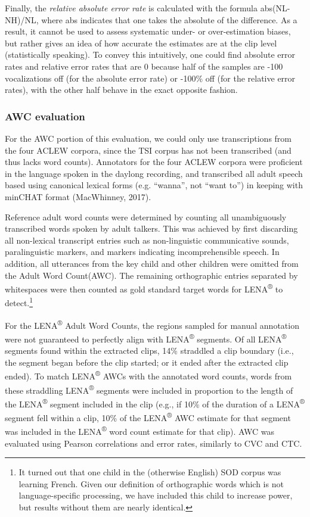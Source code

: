 \documentclass[english,table,man,floatsintext]{apa6}
\let\rmarkdownfootnote\footnote%
\def\footnote{\protect\rmarkdownfootnote}
\begin{document}
Finally, the \emph{relative absolute error rate} is calculated with the formula abs(NL-NH)/NL, where abs indicates that one takes the absolute of the difference. As a result, it cannot be used to assess systematic under- or over-estimation biases, but rather gives an idea of how accurate the estimates are at the clip level (statistically speaking). To convey this intuitively, one could find absolute error rates and relative error rates that are 0 because half of the samples are -100 vocalizations off (for the absolute error rate) or -100\% off (for the relative error rates), with the other half behave in the exact opposite fashion.

\hypertarget{awc-evaluation}{%
\subsubsection{AWC evaluation}\label{awc-evaluation}}

For the AWC portion of this evaluation, we could only use transcriptions from the four ACLEW corpora, since the TSI corpus has not been transcribed (and thus lacks word counts). Annotators for the four ACLEW corpora were proficient in the language spoken in the daylong recording, and transcribed all adult speech based using canonical lexical forms (e.g. \enquote{wanna}, not \enquote{want to}) in keeping with minCHAT format (MacWhinney, 2017).

Reference adult word counts were determined by counting all unambiguously transcribed words spoken by adult talkers. This was achieved by first discarding all non-lexical transcript entries such as non-linguistic communicative sounds, paralinguistic markers, and markers indicating incomprehensible speech. In addition, all utterances from the key child and other children were omitted from the Adult Word Count(AWC). The remaining orthographic entries separated by whitespaces were then counted as gold standard target words for LENA\textsuperscript{®} to detect.\footnote{It turned out that one child in the (otherwise English) SOD corpus was learning French. Given our definition of orthographic words which is not language-specific processing, we have included this child to increase power, but results without them are nearly identical.}

For the LENA\textsuperscript{®} Adult Word Counts, the regions sampled for manual annotation were not guaranteed to perfectly align with LENA\textsuperscript{®} segments. Of all LENA\textsuperscript{®} segments found within the extracted clips, 14\% straddled a clip boundary (i.e., the segment began before the clip started; or it ended after the extracted clip ended). To match LENA\textsuperscript{®} AWCs with the annotated word counts, words from these straddling LENA\textsuperscript{®} segments were included in proportion to the length of the LENA\textsuperscript{®} segment included in the clip (e.g., if 10\% of the duration of a LENA\textsuperscript{®} segment fell within a clip, 10\% of the LENA\textsuperscript{®} AWC estimate for that segment was included in the LENA\textsuperscript{®} word count estimate for that clip). AWC was evaluated using Pearson correlations and error rates, similarly to CVC and CTC.
\end{document}

